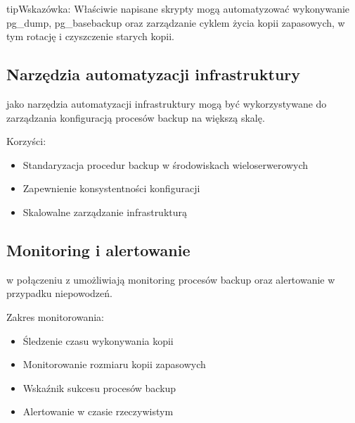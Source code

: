 \documentclass[letterpaper,10pt,polish]{sphinxmanual}
\begin{document}
\begin{sphinxadmonition}{tip}{Wskazówka:}
\sphinxAtStartPar
Właściwie napisane skrypty mogą automatyzować wykonywanie pg\_dump, pg\_basebackup oraz zarządzanie cyklem życia kopii zapasowych, w tym rotację i czyszczenie starych kopii.
\end{sphinxadmonition}


\subsection{Narzędzia automatyzacji infrastruktury}
\label{\detokenize{kopie_zapasowe_i_odzyskiwanie_danych:narzedzia-automatyzacji-infrastruktury}}
\sphinxAtStartPar
{} jako narzędzia automatyzacji infrastruktury mogą być wykorzystywane do zarządzania konfiguracją procesów backup na większą skalę.

\sphinxAtStartPar
Korzyści:
\begin{itemize}
\item {} 
\sphinxAtStartPar
Standaryzacja procedur backup w środowiskach wieloserwerowych

\item {} 
\sphinxAtStartPar
Zapewnienie konsystentności konfiguracji

\item {} 
\sphinxAtStartPar
Skalowalne zarządzanie infrastrukturą

\end{itemize}


\subsection{Monitoring i alertowanie}
\label{\detokenize{kopie_zapasowe_i_odzyskiwanie_danych:monitoring-i-alertowanie}}
\sphinxAtStartPar
{} w połączeniu z  umożliwiają monitoring procesów backup oraz alertowanie w przypadku niepowodzeń.

\sphinxAtStartPar
Zakres monitorowania:
\begin{itemize}
\item {} 
\sphinxAtStartPar
Śledzenie czasu wykonywania kopii

\item {} 
\sphinxAtStartPar
Monitorowanie rozmiaru kopii zapasowych

\item {} 
\sphinxAtStartPar
Wskaźnik sukcesu procesów backup

\item {} 
\sphinxAtStartPar
Alertowanie w czasie rzeczywistym

\end{itemize}
\end{document}
